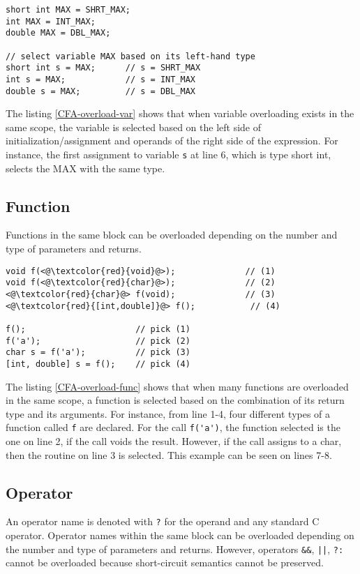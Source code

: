 \begin{lstlisting}[style=C++nokeyword, caption={Overloading variables in \CFA}, label={CFA-overload-var}]
short int MAX = SHRT_MAX;
int MAX = INT_MAX;
double MAX = DBL_MAX;

// select variable MAX based on its left-hand type
short int s = MAX;      // s = SHRT_MAX
int s = MAX;            // s = INT_MAX
double s = MAX;         // s = DBL_MAX
\end{lstlisting}

The listing \ref{CFA-overload-var} shows that when variable overloading exists
in the same scope, the variable is selected based on the left side of
initialization/assignment and operands of the right side of the expression. For
instance, the first assignment to variable \verb|s| at line 6, which is type short int,
selects the MAX with the same type.

\subsection{Function}
Functions in the same block can be overloaded depending on the number and type of
parameters and returns.

\begin{lstlisting}[style=C++nokeyword, caption={Overloading routines in \CFA},
label={CFA-overload-func}]
void f(<@\textcolor{red}{void}@>);              // (1)
void f(<@\textcolor{red}{char}@>);              // (2)
<@\textcolor{red}{char}@> f(void);              // (3)
<@\textcolor{red}{[int,double]}@> f();           // (4)

f();                      // pick (1)
f('a');                   // pick (2)
char s = f('a');          // pick (3)
[int, double] s = f();    // pick (4)
\end{lstlisting}

The listing \ref{CFA-overload-func} shows that when many functions are overloaded in
the same scope, a function is selected based on the combination of its return type and its
arguments. For instance, from line 1-4, four different types of a function called
\verb|f| are declared. For the call \verb|f('a')|, the function selected is the
one on line 2, if the call voids the result. However, if the call assigns to a
char, then the routine on line 3 is selected. This example can be seen on lines
7-8.

\subsection{Operator}
An operator name is denoted with \verb|?| for the operand and any standard C
operator. Operator names within the same block can be overloaded depending on
the number and type of parameters and returns. However, operators \verb|&&|,
\verb-||-, \verb|?:| cannot be overloaded because short-circuit semantics
cannot be preserved.


